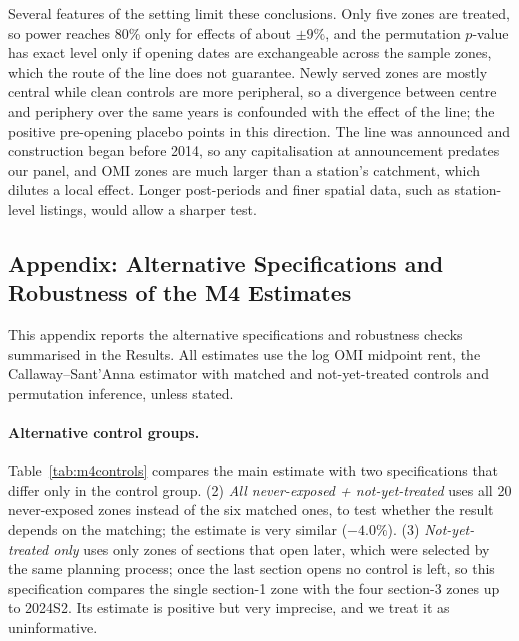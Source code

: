 Several features of the setting limit these conclusions. Only five zones are treated, so power reaches 80\% only for effects of about $\pm9\%$, and the permutation $p$-value has exact level only if opening dates are exchangeable across the sample zones, which the route of the line does not guarantee. Newly served zones are mostly central while clean controls are more peripheral, so a divergence between centre and periphery over the same years is confounded with the effect of the line; the positive pre-opening placebo points in this direction. The line was announced and construction began before 2014, so any capitalisation at announcement predates our panel, and OMI zones are much larger than a station's catchment, which dilutes a local effect. Longer post-periods and finer spatial data, such as station-level listings, would allow a sharper test.



\subsection*{Appendix: Alternative Specifications and Robustness of the M4 Estimates}
\renewcommand{\thetable}{A\arabic{table}}
\setcounter{table}{0}

This appendix reports the alternative specifications and robustness checks summarised in the Results. All estimates use the log OMI midpoint rent, the Callaway--Sant'Anna estimator with matched and not-yet-treated controls and permutation inference, unless stated.

\paragraph{Alternative control groups.} Table~\ref{tab:m4controls} compares the main estimate with two specifications that differ only in the control group. (2) \textit{All never-exposed + not-yet-treated} uses all 20 never-exposed zones instead of the six matched ones, to test whether the result depends on the matching; the estimate is very similar ($-4.0\%$). (3) \textit{Not-yet-treated only} uses only zones of sections that open later, which were selected by the same planning process; once the last section opens no control is left, so this specification compares the single section-1 zone with the four section-3 zones up to 2024S2. Its estimate is positive but very imprecise, and we treat it as uninformative.

